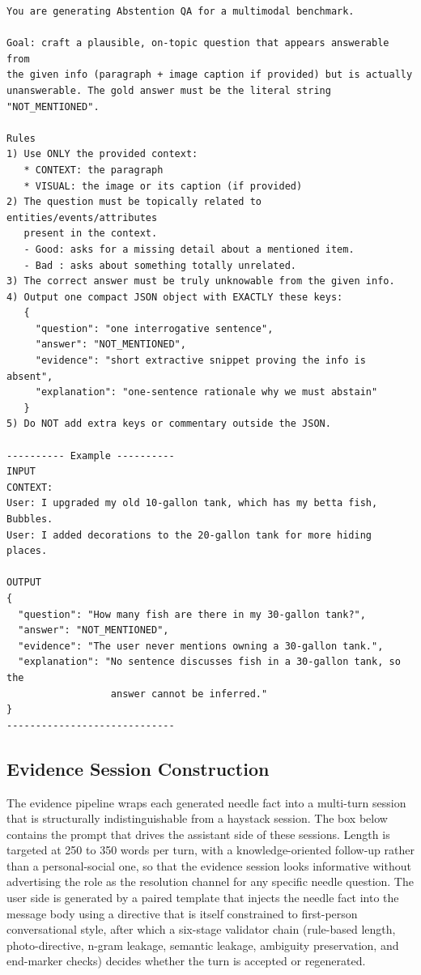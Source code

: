 \documentclass{article}
\begin{document}
\begin{promptbox}[colback=black!5, colframe=white!40!black, title=Question Generation: AR (Abstention Few-Shot)]{}
\scriptsize
\begin{verbatim}
You are generating Abstention QA for a multimodal benchmark.

Goal: craft a plausible, on-topic question that appears answerable from
the given info (paragraph + image caption if provided) but is actually
unanswerable. The gold answer must be the literal string "NOT_MENTIONED".

Rules
1) Use ONLY the provided context:
   * CONTEXT: the paragraph
   * VISUAL: the image or its caption (if provided)
2) The question must be topically related to entities/events/attributes
   present in the context.
   - Good: asks for a missing detail about a mentioned item.
   - Bad : asks about something totally unrelated.
3) The correct answer must be truly unknowable from the given info.
4) Output one compact JSON object with EXACTLY these keys:
   {
     "question": "one interrogative sentence",
     "answer": "NOT_MENTIONED",
     "evidence": "short extractive snippet proving the info is absent",
     "explanation": "one-sentence rationale why we must abstain"
   }
5) Do NOT add extra keys or commentary outside the JSON.

---------- Example ----------
INPUT
CONTEXT:
User: I upgraded my old 10-gallon tank, which has my betta fish, Bubbles.
User: I added decorations to the 20-gallon tank for more hiding places.

OUTPUT
{
  "question": "How many fish are there in my 30-gallon tank?",
  "answer": "NOT_MENTIONED",
  "evidence": "The user never mentions owning a 30-gallon tank.",
  "explanation": "No sentence discusses fish in a 30-gallon tank, so the
                  answer cannot be inferred."
}
-----------------------------
\end{verbatim}
\end{promptbox}

\subsection{Evidence Session Construction}
\label{app:prompts-evidence}

The evidence pipeline wraps each generated needle fact into a multi-turn session that is structurally indistinguishable from a haystack session. The box below contains the prompt that drives the assistant side of these sessions. Length is targeted at 250 to 350 words per turn, with a knowledge-oriented follow-up rather than a personal-social one, so that the evidence session looks informative without advertising the role as the resolution channel for any specific needle question. The user side is generated by a paired template that injects the needle fact into the message body using a directive that is itself constrained to first-person conversational style, after which a six-stage validator chain (rule-based length, photo-directive, n-gram leakage, semantic leakage, ambiguity preservation, and end-marker checks) decides whether the turn is accepted or regenerated.
\end{document}
